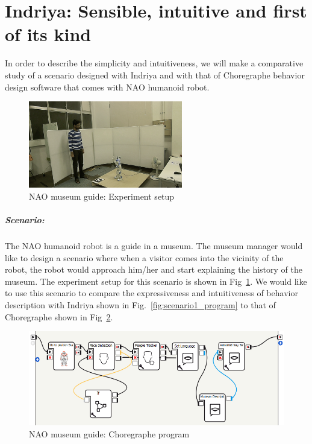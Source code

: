 \section{Indriya: Sensible, intuitive and first of its kind}
In order to describe the simplicity and intuitiveness, we will make a comparative study of a scenario designed with Indriya and with that of Choregraphe behavior design software that comes with NAO humanoid robot. 
\begin{figure}[H]
\centering
\includegraphics[width=0.6\textwidth]{../thesis/assets/scenario_museum.png}
\caption[NAO museum guide: Experiment setup]{NAO museum guide: Experiment setup}
\label{fig:scenario1_setup}
\end{figure}
\subparagraph{Scenario:}The NAO humanoid robot is a guide in a museum. The museum manager would like to design a scenario where when a visitor comes into the vicinity of the robot, the robot would approach him/her and start explaining the history of the museum. The experiment setup for this scenario is shown in Fig~\ref{fig:scenario1_setup}. We would like to use this scenario to compare the expressiveness and intuitiveness of behavior description with Indriya shown in Fig.~\ref{fig:scenario1_program} to that of Choregraphe shown in Fig~\ref{fig:scenario1_program_choregraphe}.
\begin{figure}[H]
\centering
\includegraphics[width=\textwidth]{../thesis/assets/scenario_museum_choregraphe3.png}
\caption[NAO museum guide: Choregraphe program]{NAO museum guide: Choregraphe program}
\label{fig:scenario1_program_choregraphe}
\end{figure}
